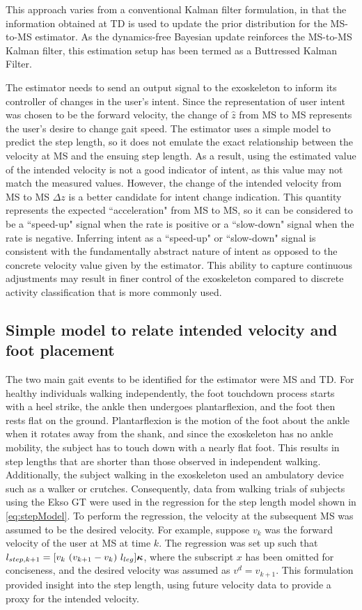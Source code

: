 This approach varies from a conventional Kalman filter formulation, in that the information obtained at TD is used to update the prior distribution for the MS-to-MS estimator. As the dynamics-free Bayesian update reinforces the MS-to-MS Kalman filter, this estimation setup has been termed as a Buttressed Kalman Filter.

The estimator needs to send an output signal to the exoskeleton to inform its controller of changes in the user's intent. Since the representation of user intent was chosen to be the forward velocity, the change of $ \hat{z} $ from MS to MS represents the user's desire to change gait speed. The estimator uses a simple model to predict the step length, so it does not emulate the exact relationship between the velocity at MS and the ensuing step length. As a result, using the estimated value of the intended velocity is not a good indicator of intent, as this value may not match the measured values. However, the change of the intended velocity from MS to MS $ \Delta z $ is a better candidate for intent change indication. This quantity represents the expected ``acceleration" from MS to MS, so it can be considered to be a ``speed-up" signal when the rate is positive or a ``slow-down" signal when the rate is negative. Inferring intent as a ``speed-up" or ``slow-down" signal is consistent with the fundamentally abstract nature of intent as opposed to the concrete velocity value given by the estimator. This ability to capture continuous adjustments may result in finer control of the exoskeleton compared to discrete activity classification that is more commonly used.

\subsection{Simple model to relate intended velocity and foot placement}

The two main gait events to be identified for the estimator were MS and TD. For healthy individuals walking independently, the foot touchdown process starts with a heel strike, the ankle then undergoes plantarflexion, and the foot then rests flat on the ground. Plantarflexion is the motion of the foot about the ankle when it rotates away from the shank, and since the exoskeleton has no ankle mobility, the subject has to touch down with a nearly flat foot. This results in step lengths that are shorter than those observed in independent walking. Additionally, the subject walking in the exoskeleton used an ambulatory device such as a walker or crutches. Consequently, data from walking trials of subjects using the Ekso GT \cite{exoWalkerData} were used in the regression for the step length model shown in \eqref{eq:stepModel}. To perform the regression, the velocity at the subsequent MS was assumed to be the desired velocity. For example, suppose $ v_k $ was the forward velocity of the user at MS at time $ k $. The regression was set up such that $ l_{step,{k+1}} = [v_{k}\ (v_{k+1}-v_{k})\ l_{leg}] \boldsymbol{\kappa} $, where the subscript $ x $ has been omitted for conciseness, and the desired velocity was assumed as $ v^d = v_{k+1} $. This formulation provided insight into the step length, using future velocity data to provide a proxy for the intended velocity.

